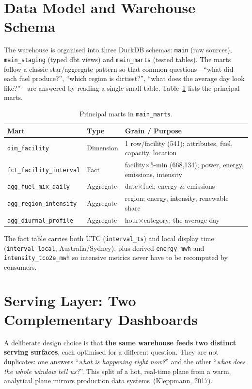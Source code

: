\documentclass[onecolumn,11pt]{IEEEtran}
\begin{document}
\section{Data Model and Warehouse Schema}\label{sec:model}
The warehouse is organised into three DuckDB schemas: \texttt{main} (raw
sources), \texttt{main\_staging} (typed dbt views) and \texttt{main\_marts}
(tested tables). The marts follow a classic star/aggregate pattern so that common
questions---``what did each fuel produce?'', ``which region is dirtiest?'',
``what does the average day look like?''---are answered by reading a single small
table. Table~\ref{tab:marts} lists the principal marts.

\begin{table}[t]
\caption{Principal marts in \texttt{main\_marts}.}
\label{tab:marts}
\centering\footnotesize
\begin{tabular}{@{}p{}p{}p{}@{}}
\toprule
\textbf{Mart} & \textbf{Type} & \textbf{Grain / Purpose}\\
\midrule
\texttt{dim\_facility} & Dimension & 1 row/facility (541); attributes, fuel, capacity, location\\
\texttt{fct\_facility\_interval} & Fact & facility$\times$5-min (668{,}134); power, energy, emissions, intensity\\
\texttt{agg\_fuel\_mix\_daily} & Aggregate & date$\times$fuel; energy \& emissions\\
\texttt{agg\_region\_intensity} & Aggregate & region; energy, intensity, renewable share\\
\texttt{agg\_diurnal\_profile} & Aggregate & hour$\times$category; the average day\\
\bottomrule
\end{tabular}
\end{table}

The fact table carries both UTC (\texttt{interval\_ts}) and local display time
(\texttt{interval\_local}, Australia/Sydney), plus derived \texttt{energy\_mwh}
and \texttt{intensity\_tco2e\_mwh} so intensive metrics never have to be
recomputed by consumers.

\section{Serving Layer: Two Complementary Dashboards}\label{sec:serve}
A deliberate design choice is that \textbf{the same warehouse feeds two distinct
serving surfaces}, each optimised for a different question. They are not
duplicates: one answers ``\emph{what is happening right now?}'' and the other
``\emph{what does the whole window tell us?}''. This split of a hot, real-time
plane from a warm, analytical plane mirrors production data
systems~(Kleppmann, 2017).
\end{document}
